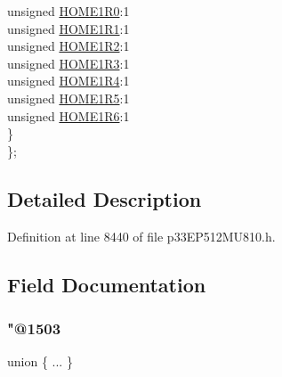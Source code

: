 \begin{DoxyCompactItemize}
\begin{tabbing}
\>\>unsigned \hyperlink{structtag_r_p_i_n_r15_b_i_t_s_a2a01607921db347a7b244672361c4a63}{HOME1R0}:1\\
\>\>unsigned \hyperlink{structtag_r_p_i_n_r15_b_i_t_s_af2b17ebe223364697b4aa5a55db2c36e}{HOME1R1}:1\\
\>\>unsigned \hyperlink{structtag_r_p_i_n_r15_b_i_t_s_ad8981fa5b57a33adfdaf2007ab1e64a9}{HOME1R2}:1\\
\>\>unsigned \hyperlink{structtag_r_p_i_n_r15_b_i_t_s_a39e70f708b2ebf7cfcc5f7743b02402b}{HOME1R3}:1\\
\>\>unsigned \hyperlink{structtag_r_p_i_n_r15_b_i_t_s_a2ad0de4cd6a0d1d54c642c4e1517dad1}{HOME1R4}:1\\
\>\>unsigned \hyperlink{structtag_r_p_i_n_r15_b_i_t_s_aac1ff79971a9f703f05bbed1bd22a30d}{HOME1R5}:1\\
\>\>unsigned \hyperlink{structtag_r_p_i_n_r15_b_i_t_s_a1e68809b95f711bc22b54ef86438f374}{HOME1R6}:1\\
\>\} \\
\}; \\

\end{tabbing}\end{DoxyCompactItemize}


\subsection{Detailed Description}


Definition at line 8440 of file p33\+E\+P512\+M\+U810.\+h.



\subsection{Field Documentation}
\mbox{\label{structtag_r_p_i_n_r15_b_i_t_s_a7584951bfafc5be2d2d2f6bd5bf98be5}} 
\subsubsection{\texorpdfstring{"@1503}{@1503}}
{\footnotesize\ttfamily union \{ ... \} }

\mbox{\label{structtag_r_p_i_n_r15_b_i_t_s_adf71f3d8410c1f1dbbc96680a92c49af}} 
